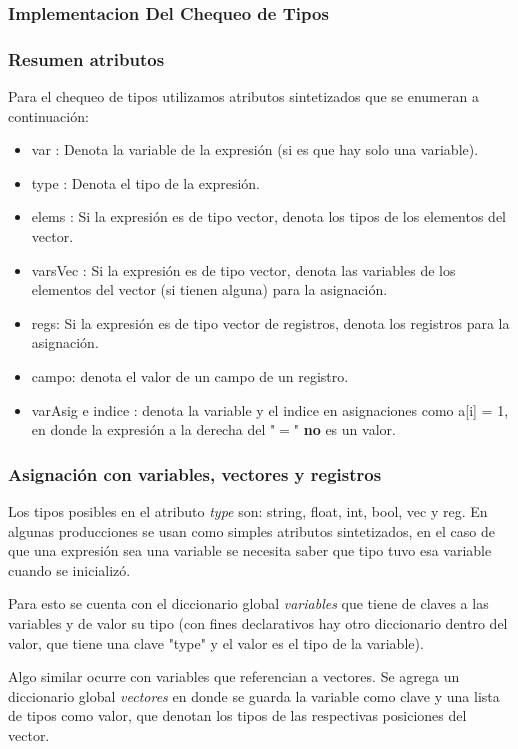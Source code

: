 \subsubsection{Implementacion Del Chequeo de Tipos}

\subsubsection{Resumen atributos}

Para el chequeo de tipos utilizamos atributos sintetizados que se enumeran a continuación:

\begin{itemize}
\item var : Denota la variable de la expresión (si es que hay solo una variable).
\item type : Denota el tipo de la expresión.
\item elems : Si la expresión es de tipo vector, denota los tipos de los elementos del vector.
\item varsVec : Si la expresión es de tipo vector, denota las variables de los elementos del vector (si tienen alguna) para la asignación.
\item regs: Si la expresión es de tipo vector de registros, denota los registros para la asignación.
\item campo: denota el valor de un campo de un registro.
\item varAsig e indice : denota la variable y el indice en asignaciones como a[i] = 1, 
en donde la expresión a la derecha del "$=$" \textbf{no} es un valor.
\end{itemize}

\subsubsection{Asignación con variables, vectores y registros}
Los tipos posibles en el atributo \textit{type} son: string, float, int, bool, vec y reg. En algunas producciones se usan como simples atributos sintetizados, en el caso de que una expresión sea una variable se necesita saber que tipo tuvo esa variable cuando se inicializó. 

Para esto se cuenta con el diccionario global \textit{variables} que tiene de claves a las variables y de valor su tipo (con fines declarativos hay otro diccionario dentro del valor, que tiene una clave "type" y el valor es el tipo de la variable).

Algo similar ocurre con variables que referencian a  vectores. Se agrega un diccionario global \textit{vectores} en donde se guarda la variable como clave y una lista de tipos como valor, que denotan los tipos de las respectivas posiciones del vector.

